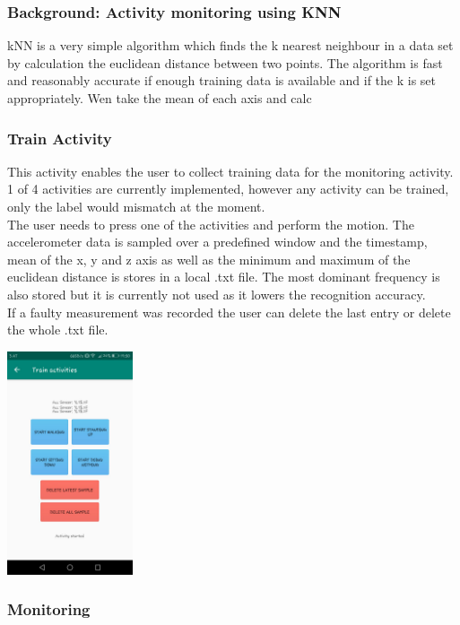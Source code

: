 \documentclass[12pt]{article}
\begin{document}
\subsubsection{Background: Activity monitoring using KNN}
kNN is a very simple algorithm which finds the k nearest neighbour in a data set by calculation the euclidean distance between two points. The algorithm is fast and reasonably accurate if enough training data is available and if the k is set appropriately. Wen take the mean of each axis and calc

\subsubsection{Train Activity}
This activity enables the user to collect training data for the monitoring activity. 1 of 4 activities are currently implemented, however any activity can be trained, only the label would mismatch at the moment.
\\
The user needs to press one of the activities and perform the motion. The accelerometer data is sampled over a predefined window and the timestamp, mean of the x, y and z axis as well as the minimum and maximum of the euclidean distance is stores in a local .txt file. The most dominant frequency is also stored but it is currently not used as it lowers the recognition accuracy.
\\
If a faulty measurement was recorded the user can delete the last entry or delete the whole .txt file.

\begin{center}
  \includegraphics[width=140px]{images/train_activity}
\end{center}

\pagebreak

\subsubsection{Monitoring}
\end{document}
